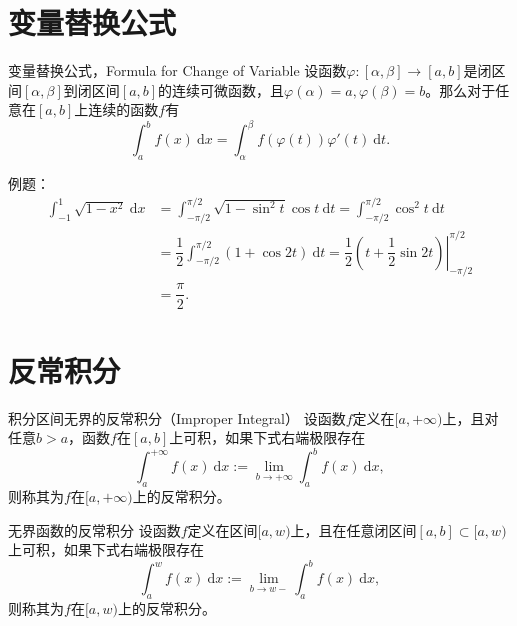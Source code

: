 

\section{变量替换公式}


\begin{frame}

\begin{block}{变量替换公式，Formula for Change of Variable}
设函数$\varphi: [\alpha,\beta] \to [a,b]$是闭区间$[\alpha,\beta]$到闭区间$[a,b]$的连续可微函数，且$\varphi(\alpha) = a, \varphi(\beta) = b$。那么对于任意在$[a,b]$上连续的函数$f$有
\[\int_a^b f(x) ~ \mathrm{d} x = \int_{\alpha}^{\beta} f(\varphi(t))\varphi'(t) ~ \mathrm{d} t.\]
\end{block}

\pause

例题：
\begin{align*}
\int_{-1}^{1} \sqrt{1-x^2} ~ \mathrm{d}x & = \int_{-\pi/2}^{\pi/2} \sqrt{1-\sin^2t}\cos t ~ \mathrm{d}t = \int_{-\pi/2}^{\pi/2} \cos^2 t ~ \mathrm{d}t \\
& = \dfrac{1}{2} \int_{-\pi/2}^{\pi/2} (1+\cos 2t) ~ \mathrm{d}t = \left.\dfrac{1}{2}\left(t + \dfrac{1}{2}\sin 2t \right)\right\vert_{-\pi/2}^{\pi/2} \\
& = \dfrac{\pi}{2}.
\end{align*}

\end{frame}


\section{反常积分}


\begin{frame}

\begin{block}{积分区间无界的反常积分（Improper Integral）}
设函数$f$定义在$[a,+\infty)$上，且对任意$b>a$，函数$f$在$[a,b]$上可积，如果下式右端极限存在
\[\int_a^{+\infty} f(x) ~ \mathrm{d}x := \lim\limits_{b\to+\infty} \int_a^b f(x) ~ \mathrm{d}x,\]
则称其为$f$在$[a,+\infty)$上的反常积分。
\end{block}

\pause

\begin{block}{无界函数的反常积分}
设函数$f$定义在区间$[a,w)$上，且在任意闭区间$[a,b]\subset [a,w)$上可积，如果下式右端极限存在
\[\int_a^w f(x) ~ \mathrm{d}x := \lim\limits_{b\to w-} \int_a^b f(x) ~ \mathrm{d}x,\]
则称其为$f$在$[a,w)$上的反常积分。
\end{block}

\end{frame}

